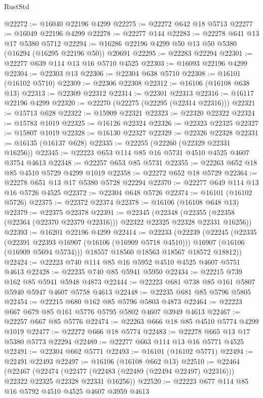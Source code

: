 \begin{lexlean}{RustStd}
\begin{coremodule}
@22272 := @16040 @22196 @4299
@22275 := @22272 @642 @18 @5713
@22277 := @16049 @22196 @4299
@22278 := @22277 @144
@22283 := @22278 @641 @13 @17 @5380 @5712
@22294 := @16286 @22196 @4299 @50 @13 @50 @5380 (@16294 (@16295 @22196 @50)) @20691
@22295 := @22283 @22294
@22301 := @22277 @639 @114 @13 @16 @5710 @4525
@22303 := @16093 @22196 @4299
@22304 := @22303 @13
@22306 := @22304 @638 @5710
@22308 := @16101 (@16102 @5710)
@22309 := @22306 @22308
@22312 := @16106 (@16108 @638 @13)
@22313 := @22309 @22312
@22314 := @22301 @22313
@22316 := @16117 @22196 @4299
@22320 := @22270 (@22275 (@22295 (@22314 @22316)))
@22321 := @15713 @628
@22322 := @15909 @22321
@22323 := @22320 @22322
@22324 := @15783 @1019
@22325 := @16126 @22324
@22326 := @22323 @22325
@22327 := @15807 @1019
@22328 := @16130 @22327
@22329 := @22326 @22328
@22331 := @16135 (@16137 @628)
@22335 := @22255 (@22260 (@22329 @22331 @16256))
@22345 := @22223 @653 @114 @85 @16 @5731 @4510 @4525 @4607 @3754 @4613
@22348 := @22257 @653 @85 @5731
@22355 := @22263 @652 @18 @85 @4510 @5729 @4299 @1019
@22358 := @22272 @652 @18 @5729
@22364 := @22278 @651 @13 @17 @5380 @5728 @22294
@22370 := @22277 @649 @114 @13 @16 @5726 @4525
@22372 := @22304 @648 @5726
@22374 := @16101 (@16102 @5726)
@22375 := @22372 @22374
@22378 := @16106 (@16108 @648 @13)
@22379 := @22375 @22378
@22391 := @22345
    (@22348 (@22355 (@22358 (@22364 (@22370 @22379 @22316))) @22322 @22325 @22328 @22331 @16256))
@22393 := @16201 @22196 @4299
@22414 := @22233
    (@22239
      (@22245
        (@22335
          (@22391 @22393 @16907 (@16106 (@16909 @5718 @4510)))
          @16907
          (@16106 (@16909 @5694 @5734)))
        @18557
        @18560
        @18563
        @18567
        @18572
        @18812))
@22424 := @22223 @740 @114 @85 @16 @5952 @4510 @4525 @4607 @5751 @4613
@22428 := @22235 @740 @85 @5941 @5950
@22434 := @22215 @739 @162 @85 @5941 @5948 @4873
@22444 := @22223 @681 @738 @85 @161 @5807 @5940 @5947 @4607 @5758 @4613
@22448 := @22235 @681 @85 @5796 @5805
@22454 := @22215 @680 @162 @85 @5796 @5803 @4873
@22464 := @22223 @667 @679 @85 @161 @5776 @5795 @5802 @4607 @3949 @4613
@22467 := @22257 @667 @85 @5776
@22474 := @22263 @666 @18 @85 @4510 @5774 @4299 @1019
@22477 := @22272 @666 @18 @5774
@22483 := @22278 @665 @13 @17 @5380 @5773 @22294
@22489 := @22277 @663 @114 @13 @16 @5771 @4525
@22491 := @22304 @662 @5771
@22493 := @16101 (@16102 @5771)
@22494 := @22491 @22493
@22497 := @16106 (@16108 @662 @13)
@22510 := @22464
    (@22467
      (@22474 (@22477 (@22483 (@22489 (@22494 @22497) @22316))) @22322 @22325 @22328 @22331 @16256))
@22520 := @22223 @677 @114 @85 @16 @5792 @4510 @4525 @4607 @3959 @4613

\end{coremodule}
\end{lexlean}
